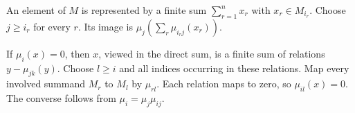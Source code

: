 An element of $M$ is represented by a finite sum $\sum_{r=1}^n x_r$ with $x_r\in M_{i_r}$. Choose $j\geq i_r$ for every $r$. Its image is $\mu_j(\sum_r\mu_{i_rj}(x_r))$.

If $\mu_i(x)=0$, then $x$, viewed in the direct sum, is a finite sum of relations $y-\mu_{jk}(y)$. Choose $l\geq i$ and all indices occurring in these relations. Map every involved summand $M_r$ to $M_l$ by $\mu_{rl}$. Each relation maps to zero, so $\mu_{il}(x)=0$. The converse follows from $\mu_i=\mu_j\mu_{ij}$.
